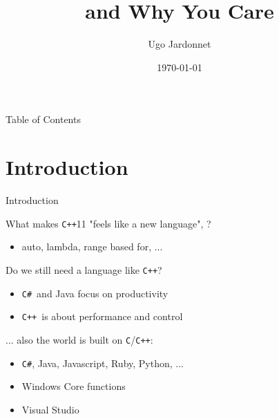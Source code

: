 \documentclass[svgnames,smaller]{beamer}
\title{\cpp 11 and Why You Care}
\author{Ugo Jardonnet}
\date{\today}
\newcommand*{\cpp}{\texttt{C++}}
\newcommand*{\csharp}{\texttt{C\#}}
\begin{document}

\begin{frame}
  \titlepage
\end{frame}

\begin{frame}{Table of Contents}
  \tableofcontents
\end{frame}

\section{Introduction}

\begin{frame}[fragile]{Introduction}
  \begin{block}{What makes \cpp11 "feels like a new language",
      \citeauthor{stroustrup-think} \cite{stroustrup-think} ?}
    \begin{itemize}
    \item auto, lambda, range based for, ...
    \end{itemize}
  \end{block}

  \begin{alertblock}{Do we still need a language like \cpp ?}
    \begin{itemize}
    \item \csharp\  and Java focus on productivity
    \item \cpp\  is about performance and control
    \end{itemize}
  \end{alertblock}

  ... also the world is built on \texttt{C}/\cpp:
  \begin{itemize}
  \item \csharp, Java, Javascript, Ruby, Python, ... %
  \item Windows Core functions \cite{sutter-why}
  \item Visual Studio %
  \end{itemize}

\end{frame}
\end{document}
